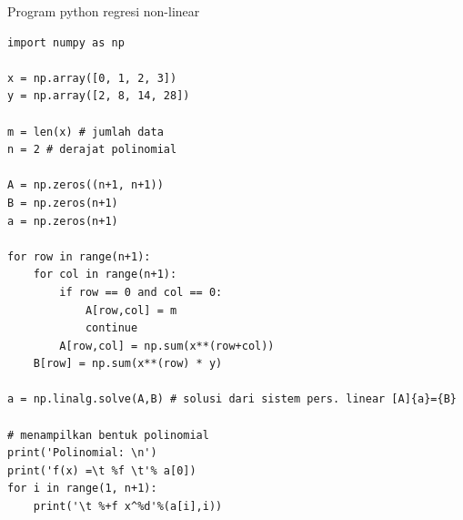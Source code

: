 \documentclass[pdflatex,compress,mathserif]{beamer}
\begin{document}
\begin{frame}[fragile]{Program python regresi non-linear}
	\begin{verbatim}
import numpy as np

x = np.array([0, 1, 2, 3])
y = np.array([2, 8, 14, 28])

m = len(x) # jumlah data
n = 2 # derajat polinomial

A = np.zeros((n+1, n+1))
B = np.zeros(n+1)
a = np.zeros(n+1)

for row in range(n+1):
    for col in range(n+1):
        if row == 0 and col == 0:
            A[row,col] = m
            continue
        A[row,col] = np.sum(x**(row+col))
    B[row] = np.sum(x**(row) * y)

a = np.linalg.solve(A,B) # solusi dari sistem pers. linear [A]{a}={B}

# menampilkan bentuk polinomial
print('Polinomial: \n')
print('f(x) =\t %f \t'% a[0])
for i in range(1, n+1):
    print('\t %+f x^%d'%(a[i],i))
	\end{verbatim}
\end{frame}
\end{document}
